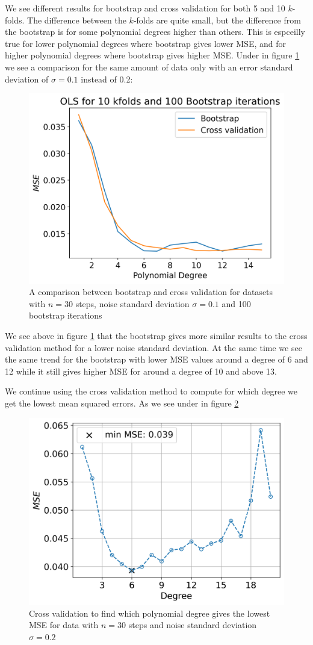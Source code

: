 \documentclass[12pt]{article}
\begin{document}
We see different results for bootstrap and cross validation for both 5 and 10 $k$-folds. The difference between the $k$-folds are quite small, but the difference from the bootstrap is for some polynomial degrees higher than others. This is espceilly true for lower polynomial degrees where bootstrap gives lower MSE, and for higher polynomial degrees where bootstrap gives higher MSE. Under in figure \ref{fig:cv_comp_01} we see a comparison for the same amount of data only with an error standard deviation of $\sigma=0.1$ instead of 0.2:
\begin{figure}[H]
  \centering
  \includegraphics[width=.7\textwidth]{../figures/boot_cv_comp_01.png}
  \caption{A comparison between bootstrap and cross validation for datasets with $n=30$ steps, noise standard deviation $\sigma=0.1$ and 100 bootstrap iterations}
  \label{fig:cv_comp_01}
\end{figure}
We see above in figure \ref{fig:cv_comp_01} that the bootstrap gives more similar results to the cross validation method for a lower noise standard deviation. At the same time we see the same trend for the bootstrap with lower MSE values around a degree of 6 and 12 while it still gives higher MSE for around a degree of 10 and above 13.

We continue using the cross validation method to compute for which degree we get the lowest mean squared errors. As we see under in figure \ref{fig:best_OLS}
\begin{figure}[H]
  \centering
  \includegraphics[width=.7\textwidth]{../figures/best_lambda_OLS_02_franke.png}
  \caption{Cross validation to find which polynomial degree gives the lowest MSE for data with $n=30$ steps and noise standard deviation $\sigma=0.2$}
  \label{fig:best_OLS}
\end{figure}
\end{document}
